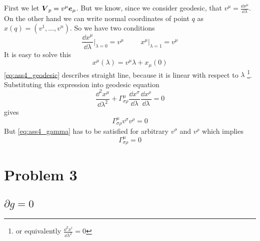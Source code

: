 First we let $\boldsymbol{V}_p=v^\mu \boldsymbol{e}_\mu$. But we know, since we consider
geodesic, that $v^\mu = \frac{\dd x^\mu}{\dd \lambda}$.  On the other hand we
can write normal coordinates of point $q$ as $x(q)=(v^1,\dots,v^n)$. So we have
two conditions
%
\begin{equation}
    \frac{\dd x^\mu}{\dd \lambda} \Big|_{\lambda=0} = v^\mu
    \hspace{1cm}
    x^\mu  \Big|_{\lambda=1}= v^\mu
\end{equation}
%
It is easy to solve this
%
\begin{equation}
    x^\mu\left(\lambda\right) = v^\mu \lambda + x_\mu\left(0\right)
    \label{eq:ass4_geodesic}
\end{equation}
%
\autoref{eq:ass4_geodesic} describes straight line, because it is linear with
respect to $\lambda$ \footnote{or equivalently $\frac{\dd^2 x^i}{\dd
            \lambda^2}=0$}.
%
Substituting this expression into geodesic equation
%
\begin{equation}
    \frac{\dd^2 x^\mu}{\dd \lambda^2} +
    \Gamma_{\sigma\rho}^\mu\frac{\dd x^\sigma}{\dd \lambda}\frac{\dd x^\rho}{\dd \lambda} = 0
\end{equation}
%
gives
%
\begin{equation}
    \Gamma_{\sigma\rho}^\mu v^\sigma v^\rho = 0
    \label{eq:ass4_gamma}
\end{equation}
%
But \autoref{eq:ass4_gamma} has to be satisfied for arbitrary $v^\sigma$ and
$v^\rho$ which implies
%
\begin{equation}
    \boxed{\Gamma_{\sigma\rho}^\mu = 0}
\end{equation}
%
\section*{Problem 3}

\subsection{\texorpdfstring{$\partial g = 0$}{TEXT}}

